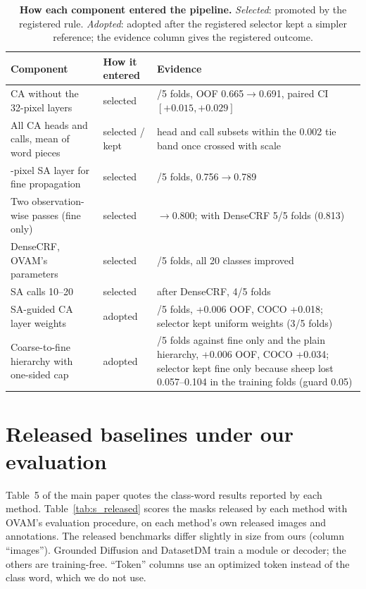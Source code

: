 \documentclass[10pt,twocolumn,letterpaper]{article}
\begin{document}
\begin{table}[t]
\centering
\footnotesize\setlength{\tabcolsep}{4pt}
\begin{tabular}{@{}>{\raggedright\arraybackslash}p{5.4cm}l>{\raggedright\arraybackslash}p{9.2cm}@{}}
\toprule
Component & How it entered & Evidence \\
\midrule
CA without the 32-pixel layers & selected & 4/5 folds, OOF 0.665$\rightarrow$0.691, paired CI $[+0.015,+0.029]$ \\
All CA heads and calls, mean of word pieces & selected / kept & head and call subsets within the 0.002 tie band once crossed with scale \\
64-pixel SA layer for fine propagation & selected & 5/5 folds, 0.756$\rightarrow$0.789 \\
Two observation-wise passes (fine only) & selected & 0.788$\rightarrow$0.800; with DenseCRF 5/5 folds (0.813) \\
DenseCRF, OVAM's parameters & selected & 5/5 folds, all 20 classes improved \\
SA calls 10--20 & selected & after DenseCRF, 4/5 folds \\
SA-guided CA layer weights & adopted & 4/5 folds, +0.006 OOF, COCO +0.018; selector kept uniform weights (3/5 folds) \\
Coarse-to-fine hierarchy with one-sided cap & adopted & 5/5 folds against fine only and the plain hierarchy, +0.006 OOF, COCO +0.034; selector kept fine only because sheep lost 0.057--0.104 in the training folds (guard 0.05) \\
\bottomrule
\end{tabular}
\caption{\textbf{How each component entered the pipeline.} \emph{Selected}: promoted by the registered rule. \emph{Adopted}: adopted after the registered selector kept a simpler reference; the evidence column gives the registered outcome.}
\label{tab:s_status}
\end{table}

\section{Released baselines under our evaluation}
\label{sec:s_baselines}
Table~5 of the main paper quotes the class-word results reported by each method. Table~\ref{tab:s_released} scores the masks released by each method with OVAM's evaluation procedure, on each method's own released images and annotations. The released benchmarks differ slightly in size from ours (column ``images''). Grounded Diffusion and DatasetDM train a module or decoder; the others are training-free. ``Token'' columns use an optimized token instead of the class word, which we do not use.
\end{document}
